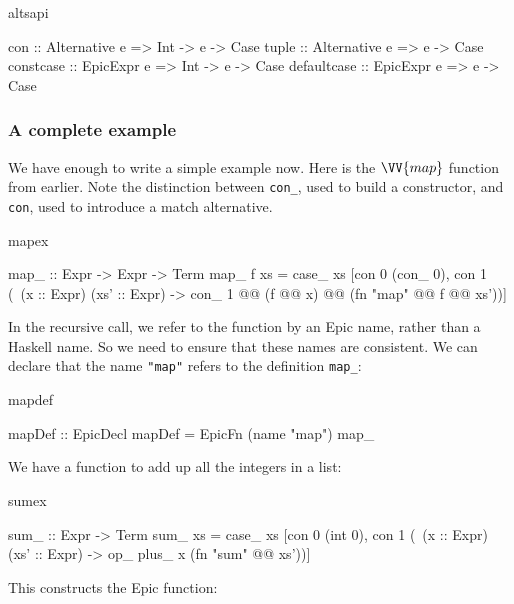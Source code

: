 \begin{SaveVerbatim}{altsapi}

con         :: Alternative e => Int -> e -> Case
tuple       :: Alternative e =>        e -> Case
constcase   :: EpicExpr e    => Int -> e -> Case
defaultcase :: EpicExpr e    =>        e -> Case

\end{SaveVerbatim}

\subsubsection*{A complete example}

We have enough to write a simple example now. Here is the $\VV{map}$
function from earlier. Note the distinction between \texttt{con\_},
used to build a constructor, and \texttt{con}, used to introduce a
match alternative.

\begin{SaveVerbatim}{mapex}

map_ :: Expr -> Expr -> Term
map_ f xs = case_ xs 
   [con 0 (con_ 0),
    con 1 (\ (x :: Expr) (xs' :: Expr)
      -> con_ 1 @@ (f @@ x) @@ (fn "map" @@ f @@ xs'))]

\end{SaveVerbatim}

In the recursive call, we refer to the function by an Epic name,
rather than a Haskell name. So we need to ensure that these names are
consistent. We can declare that the name \texttt{"map"} refers to the
definition \texttt{map\_}:

\begin{SaveVerbatim}{mapdef}

mapDef :: EpicDecl
mapDef = EpicFn (name "map") map_

\end{SaveVerbatim}

We have a function to add up all the integers in a list:

\begin{SaveVerbatim}{sumex}

sum_ :: Expr -> Term
sum_ xs = case_ xs
           [con 0 (int 0),
            con 1 (\ (x :: Expr) (xs' :: Expr) ->
                       op_ plus_ x (fn "sum" @@ xs'))]

\end{SaveVerbatim}

This constructs the Epic function:

